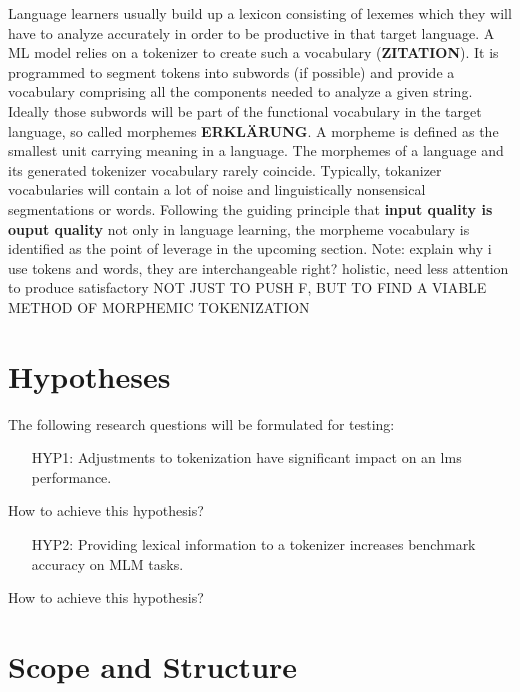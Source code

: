 Language learners usually build up a lexicon consisting of lexemes which they will have to analyze accurately in order to be productive in that target language.
A ML model relies on a tokenizer to create such a vocabulary  (\textbf{ZITATION}).
It is programmed to segment tokens into subwords (if possible) and provide a vocabulary comprising all the components needed to analyze a given string.
Ideally those subwords will be part of the functional vocabulary in the target language, so called morphemes \textbf{ERKLÄRUNG}.
A morpheme is defined as the smallest unit carrying meaning in a language.
The morphemes of a language and its generated tokenizer vocabulary rarely coincide.
Typically, tokanizer vocabularies will contain a lot of noise and linguistically nonsensical segmentations or words.
Following the guiding principle that \textbf{input quality is ouput quality} not only in language learning, the morpheme vocabulary is identified as the point of leverage in the upcoming section.
Note: explain why i use tokens and words, they are interchangeable right?
holistic, need less attention to produce satisfactory
\uppercase{not just to push F, but to find a viable method of morphemic tokenization}

\section{Hypotheses}
\label{sec:hypothesis}

The following research questions will be formulated for testing:
\begin{framed}
    \begin{itemize}[itemindent=1em]
        \item[HYP1:] Adjustments to tokenization have significant impact on an \ac{lm}s performance.
    \end{itemize}
\end{framed}
How to achieve this hypothesis?
\begin{framed}
    \begin{itemize}[itemindent=1em]
        \item[HYP2:] Providing lexical information to a tokenizer increases benchmark accuracy on MLM tasks.
    \end{itemize}
\end{framed}
How to achieve this hypothesis?

\section{Scope and Structure}
\label{sec:scope-and-structure}

